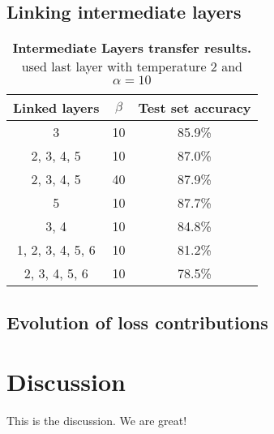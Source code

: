 \documentclass[10pt,twocolumn,letterpaper]{article}
\begin{document}
\subsection{Linking intermediate layers}
\begin{table}[]
	\begin{center}
	\begin{tabular}{|c|c|c|}
		\hline
		Linked layers	&	$\beta$	&	Test set accuracy\\ \hline
		3	&	10	&	85.9\%	\\ \hline
		2, 3, 4, 5	&	10	&	87.0\%	\\ \hline
		2, 3, 4, 5	&	40	&	87.9\%	\\ \hline
		5	&	10	&	87.7\%	\\ \hline
		3, 4	&	10	&	84.8\%	\\ \hline
		1, 2, 3, 4, 5, 6	&	10	&	81.2\%	\\ \hline
		2, 3, 4, 5, 6	&	10	&	78.5\%	\\ \hline
	\end{tabular}
	\end{center}
	\caption{\textbf{Intermediate Layers transfer results.} used last layer with temperature 2 and $ \alpha = 10 $}
	\label{tab:interemediate_results}
\end{table}

\subsection{Evolution of loss contributions}

\section{Discussion}
This is the discussion. We are great!


{\small


}
\end{document}
